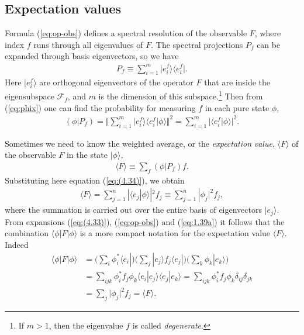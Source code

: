 \documentclass[nochecklpage]{stefan1}
\newcommand{\rrvert}{\vert}
\newcommand{\rrVert}{\Vert}
\newcommand{\llvert}{\vert}
\newcommand{\llVert}{\Vert}
\theoremstyle{definition}
\begin{document}
\subsection{Expectation values}\label{ss:expectation}
Formula (\ref{eq:op-obs}) defines a spectral resolution of the
observable $ F $, where index $ f $ runs through all eigenvalues of
$ F $. The spectral projections $ P_{f} $ can be expanded through basis
eigenvectors, so we have
%
\begin{align}
P_{f} \equiv \sum_{i=1}^{m} \bigl\llvert
e_{i}^{f} \big\rangle \big\langle e_{i}^{f}
\bigr\rrvert . \label{eq:1.39a}
\end{align}
%
Here $  \llvert   e_{i}^{f}  \rangle  $ are orthogonal eigenvectors of
the operator $ F $ that are inside the eigensubspace $ \mathscr{F}
_{f} $, and $ m $ is the dimension of this subspace.\footnote{If
$ m> 1 $, then the eigenvalue $ f $ is called \emph{degenerate}.}
Then from (\ref{eq:phix}) one can find
the probability for measuring $ f $ in each pure state $\phi $,
%
\begin{align}
( \phi | P_{f} ) = \Biggl\llVert \sum_{i=1}^{m}
\big\llvert e_{i}^{f} \big\rangle \bigl\langle e_{i}^{f}
\big| \phi \bigr\rangle \Biggr\rrVert ^{2}= \sum_{i=1}^{m}
\bigl\llvert \bigl\langle e_{i}^{f} \big| \phi \big\rangle
\bigr\rrvert ^{2}. \label{eq:(4.34)}
\end{align}

Sometimes we need to know the weighted average, or the \emph{expectation}
\emph{value},\label{lb:expectation} $ \langle F \rangle $ of the observable
$ F $ in the state $ | \phi \rangle , $
%
\begin{align*}
\langle F \rangle \equiv \sum_{f} ( \phi |
P_{f} ) f.
\end{align*}
%
Substituting here equation (\ref{eq:(4.34)}), we obtain
%
\begin{align*}
\langle F \rangle = \sum_{j=1}^{n} |\langle
e_{j} | \phi \rangle |^{2} f_{j} \equiv \sum
_{j=1}^{n} |\phi_{j}|^{2}
f_{j},
\end{align*}
%
where the summation is carried out over the entire basis of eigenvectors
$ | e_{j} \rangle $. From expansions (\ref{eq:(4.33)}),
(\ref{eq:op-obs}) and (\ref{eq:1.39a}) it follows that the combination
$ \langle \phi | F | \phi \rangle $ is a more compact notation for the
expectation value $ \langle F \rangle $. Indeed
%
\begin{align}
\langle \phi |F| \phi \rangle &= \biggl( \sum_{i}
\phi_{i}^{*} \langle e_{i} | \biggr)
\biggl( \sum_{j} | e_{j} \rangle
f_{j} \langle e_{j} | \biggr) \biggl( \sum
_{k} \phi_{k} |e_{k} \rangle
\biggr)
\nonumber
\\
&= \sum_{ijk} \phi_{i}^{*}
f_{j} \phi_{k} \langle e_{i} | e_{j}
\rangle \langle e_{j} | e_{k} \rangle = \sum
_{ijk} \phi_{i}^{*} f_{j}
\phi_{k}\delta_{ij} \delta_{jk}
\nonumber
\\
&= \sum_{j} \llvert \phi_{j} \rrvert
^{2} f_{j} = \langle F \rangle . \label{eq:fff}
\end{align}
\end{document}
